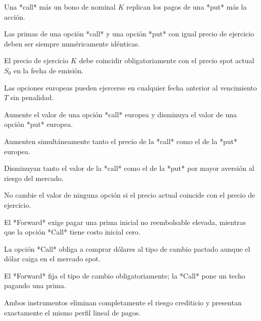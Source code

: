\begin{opts}
    \item Una *call* más un bono de nominal $K$ replican los pagos de una *put* más la acción.
    \item Las primas de una opción *call* y una opción *put* con igual precio de ejercicio deben ser siempre numéricamente idénticas.
    \item El precio de ejercicio $K$ debe coincidir obligatoriamente con el precio spot actual $S_0$ en la fecha de emisión.
    \item Las opciones europeas pueden ejercerse en cualquier fecha anterior al vencimiento $T$ sin penalidad.
\end{opts}

\begin{opts}
    \item Aumente el valor de una opción *call* europea y disminuya el valor de una opción *put* europea.
    \item Aumenten simultáneamente tanto el precio de la *call* como el de la *put* europea.
    \item Disminuyan tanto el valor de la *call* como el de la *put* por mayor aversión al riesgo del mercado.
    \item No cambie el valor de ninguna opción si el precio actual coincide con el precio de ejercicio.
\end{opts}

\begin{opts}
    \item El *Forward* exige pagar una prima inicial no reembolsable elevada, mientras que la opción *Call* tiene costo inicial cero.
    \item La opción *Call* obliga a comprar dólares al tipo de cambio pactado aunque el dólar caiga en el mercado spot.
    \item El *Forward* fija el tipo de cambio obligatoriamente; la *Call* pone un techo pagando una prima.
    \item Ambos instrumentos eliminan completamente el riesgo crediticio y presentan exactamente el mismo perfil lineal de pagos.
\end{opts}

